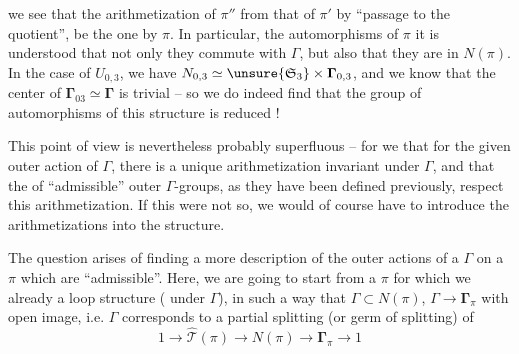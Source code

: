 
we see that the arithmetization of $\pi''$  from that of $\pi'$ by ``passage to the quotient'', be the one  by $\pi$.  In particular,  the  automorphisms of $\pi$ it is understood that  not only they commute with $\Gamma$, but also that they are in $N(\pi)$.  In the case of $U_{0,3}$, we have $N_{0,3}\simeq\unsure{\mathfrak S_3}\times\boldsymbol{\Gamma}_{0,3}$, and we know that the center of $\boldsymbol{\Gamma}_{03}\simeq\boldsymbol{\Gamma}$ is trivial -- so we do indeed find that the group of automorphisms of this structure is reduced  !

This point of view is nevertheless probably superfluous -- for we  that for the given outer action of $\Gamma$, there is a unique arithmetization invariant under $\Gamma$, and that the   of ``admissible'' outer $\Gamma$-groups, as they have been defined previously,  respect this arithmetization. If this were not so, we would of course have to introduce the arithmetizations into the structure.




The question arises of finding a more   description of the outer actions of a $\Gamma$ on a $\pi$ which are ``admissible''.  Here, we are going to start from a $\pi$ for which we already  a loop structure  ( under $\Gamma$), in  such a way that $\Gamma\subset N(\pi)$, $\Gamma\longrightarrow\boldsymbol{\Gamma}_\pi$  with open image,  i.e. $\Gamma$ corresponds to a partial splitting (or germ of splitting) of 
\[
1\longrightarrow\widehat{\mathcal T}(\pi)\longrightarrow N(\pi)\longrightarrow\boldsymbol{\Gamma}_\pi\longrightarrow1
\]

